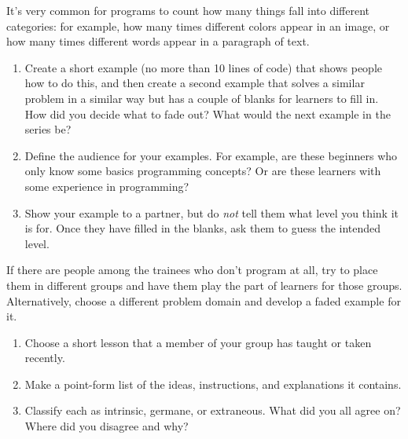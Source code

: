 

It's very common for programs to count how many things fall into different categories:
for example,
how many times different colors appear in an image,
or how many times different words appear in a paragraph of text.

\begin{enumerate}
\item
  Create a short example (no more than 10 lines of code) that shows people how to do this,
  and then create a second example that solves a similar problem in a similar way
  but has a couple of blanks for learners to fill in.
  How did you decide what to fade out?
  What would the next example in the series be?

\item
  Define the audience for your examples.
  For example,
  are these beginners who only know some basics programming concepts?
  Or are these learners with some experience in programming?

\item
  Show your example to a partner,
  but do \emph{not} tell them what level you think it is for.
  Once they have filled in the blanks,
  ask them to guess the intended level.

\end{enumerate}

If there are people among the trainees who don't program at all,
try to place them in different groups
and have them play the part of learners for those groups.
Alternatively,
choose a different problem domain and develop a faded example for it.


\begin{enumerate}

\item
  Choose a short lesson that a member of your group has taught or taken recently.

\item
  Make a point-form list of the ideas, instructions, and explanations it contains.

\item
  Classify each as intrinsic, germane, or extraneous.
  What did you all agree on?
  Where did you disagree and why?

\end{enumerate}

